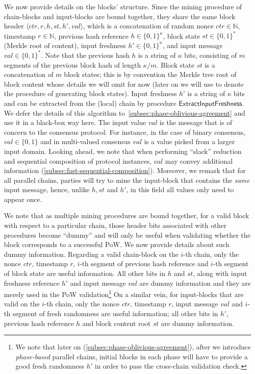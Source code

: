 

We now provide details on the blocks' structure.
%
Since the mining procedure of chain-blocks and input-blocks are bound together, they share the same block header $\langle ctr, r, h, st, h', val \rangle$, which is a concatenation of random nonce $ctr \in \mathbb{N}$, timestamp $r \in \mathbb{N}$, previous hash reference $h \in \{0, 1\}^\kappa$, block state $st \in \{0, 1\}^*$ (Merkle root of content), input freshness $h' \in \{0, 1\}^\kappa$, and input message $val \in \{0, 1\}^*$.
%
Note that the previous hash $h$ is a string of $\kappa$ bits, consisting of $m$ segments of the previous block hash of length $\kappa / m$.
%
Block state $st$ is a concatenation of $m$ block states; this is by convention the Merkle tree root of block content whose details we will omit for now (later on we will use \blockify to denote the procedure of generating block states).
%
Input freshness $h'$ is a string of $\kappa$ bits and can be extracted from the (local) chain by procedure $\mathsf{ExtractInputFreshness}$.
%
We defer the details of this algorithm to~\cref{subsec:phase-oblivious-agreement} and use it in a black-box way here.
%
The input value $val$ is the message that is of concern to the consensus protocol.
%
For instance, in the case of binary consensus, $val \in \{ 0, 1 \}$ and in multi-valued consensus $val$ is a value picked from a larger input domain.
%
Looking ahead, we note that when performing ``slack'' reduction and sequential composition of protocol instances, $val$ may convey additional information (\cref{subsec:fast-sequential-composition}).
%
Moreover, we remark that for all parallel chains, parties will try to mine the input-block that contains the \emph{same} input message, hence, unlike $h, st$ and $h'$, in this field all values only need to appear once.

We note that as multiple mining procedures are bound together, for a valid block with respect to a particular chain, those header bits associated with other procedures become ``dummy'' and will only be useful when validating whether the block corresponds to a successful PoW.
%
We now provide details about such dummy information.
%
Regarding a valid chain-block on the $i$-th chain, only the nonce $ctr$, timestamp $r$, $i$-th segment of previous hash reference  and $i$-th segment of block state  are useful information.
%
All other bits in $h$ and $st$, along with input freshness reference $h'$ and input message $val$ are dummy information and they are merely used in the PoW validation\footnote{We note that later on (\cref{subsec:phase-oblivious-agreement}), after we introduce \emph{phase-based} parallel chains, initial blocks in each phase will have to provide a good fresh randomness $h'$ in order to pass the cross-chain validation check.}
%
On a similar vein, for input-blocks that are valid on the $i$-th chain, only the nonce $ctr$, timestamp $r$, input message $val$ and $i$-th segment of fresh randomness  are useful information; all other bits in $h'$, previous hash reference $h$ and block content root $st$ are dummy information.

